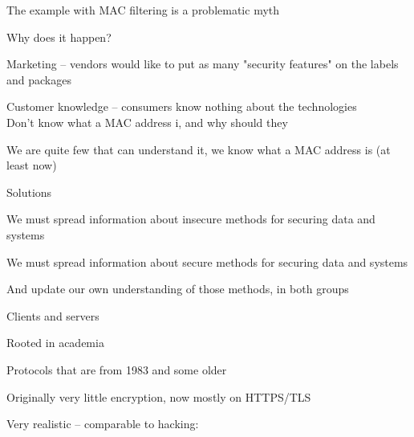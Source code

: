 \documentclass[Screen16to9,17pt]{foils}
\begin{document}

The example with MAC filtering is a problematic myth

Why does it happen?
\begin{list2}
\item Marketing -- vendors would like to put as many "security features" on the labels and packages
\item Customer knowledge -- consumers know nothing about the technologies\\
Don't know what a MAC address i, and why should they
\item We are quite few that can understand it, we know what a MAC address is (at least now)
\end{list2}

Solutions
\begin{list2}
\item We must spread information about insecure methods for securing data and systems
\item We must spread information about secure methods for securing data and systems
\item And update our own understanding of those methods, in both groups
\end{list2}










\begin{list1}
\item Clients and servers
\item Rooted in academia
\item Protocols that are from 1983 and some older
\item Originally very little encryption, now mostly on HTTPS/TLS
\end{list1}


Very realistic -- comparable to hacking:\\
\\
\end{document}
